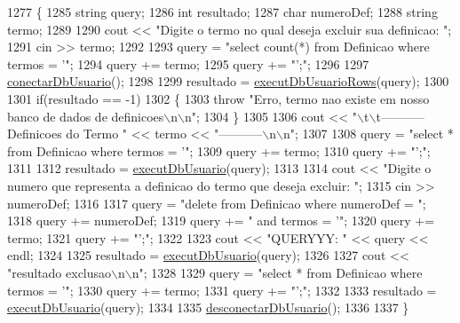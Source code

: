 \begin{DoxyCode}
1277 \{
1285   \textcolor{keywordtype}{string} query;
1286   \textcolor{keywordtype}{int} resultado;
1287   \textcolor{keywordtype}{char} numeroDef;
1288   \textcolor{keywordtype}{string} termo;
1289 
1290   cout << \textcolor{stringliteral}{"Digite o termo no qual deseja excluir sua definicao: "};
1291   cin >> termo;
1292 
1293   query = \textcolor{stringliteral}{"select count(*) from Definicao where termos = '"};
1294   query += termo;
1295   query += \textcolor{stringliteral}{"';"};
1296 
1297   \mbox{\hyperlink{comando_sql_8cpp_a4f89ddcbc4cf8f2587d89f72f8c7900d}{conectarDbUsuario}}();
1298 
1299   resultado = \mbox{\hyperlink{comando_sql_8cpp_af54952694f2fa7d76f969fb74b853cb9}{executDbUsuarioRows}}(query);
1300 
1301   \textcolor{keywordflow}{if}(resultado == -1)
1302   \{
1303     \textcolor{keywordflow}{throw} \textcolor{stringliteral}{"Erro, termo nao existe em nosso banco de dados de definicoes\(\backslash\)n\(\backslash\)n"};
1304   \}
1305 
1306   cout << \textcolor{stringliteral}{"\(\backslash\)t\(\backslash\)t----------- Definicoes do Termo "} << termo << \textcolor{stringliteral}{"-----------\(\backslash\)n\(\backslash\)n"};
1307 
1308   query = \textcolor{stringliteral}{"select * from Definicao where termos = '"};
1309   query += termo;
1310   query += \textcolor{stringliteral}{"';"};
1311 
1312   resultado = \mbox{\hyperlink{comando_sql_8cpp_a748197580e7f9acdbf48c78de1f7924b}{executDbUsuario}}(query);
1313 
1314   cout << \textcolor{stringliteral}{"Digite o numero que representa a definicao do termo que deseja excluir: "};
1315   cin >> numeroDef;
1316 
1317   query = \textcolor{stringliteral}{"delete from Definicao where numeroDef = "};
1318   query += numeroDef;
1319   query += \textcolor{stringliteral}{" and termos = '"};
1320   query += termo;
1321   query += \textcolor{stringliteral}{"';"};
1322 
1323   cout << \textcolor{stringliteral}{"QUERYYY: "} << query << endl;
1324 
1325   resultado = \mbox{\hyperlink{comando_sql_8cpp_a748197580e7f9acdbf48c78de1f7924b}{executDbUsuario}}(query);
1326 
1327   cout << \textcolor{stringliteral}{"resultado exclusao\(\backslash\)n\(\backslash\)n"};
1328 
1329   query = \textcolor{stringliteral}{"select * from Definicao where termos = '"};
1330   query += termo;
1331   query += \textcolor{stringliteral}{"';"};
1332 
1333   resultado = \mbox{\hyperlink{comando_sql_8cpp_a748197580e7f9acdbf48c78de1f7924b}{executDbUsuario}}(query);
1334 
1335   \mbox{\hyperlink{comando_sql_8cpp_a969be9911913568e30d4ae8963338bc3}{desconectarDbUsuario}}();
1336 
1337 \}
\end{DoxyCode}
\mbox{\label{class_servico_usuarios_desenvolvedor_a20712917886eaf28a2a9b308d14d7b04}} 
